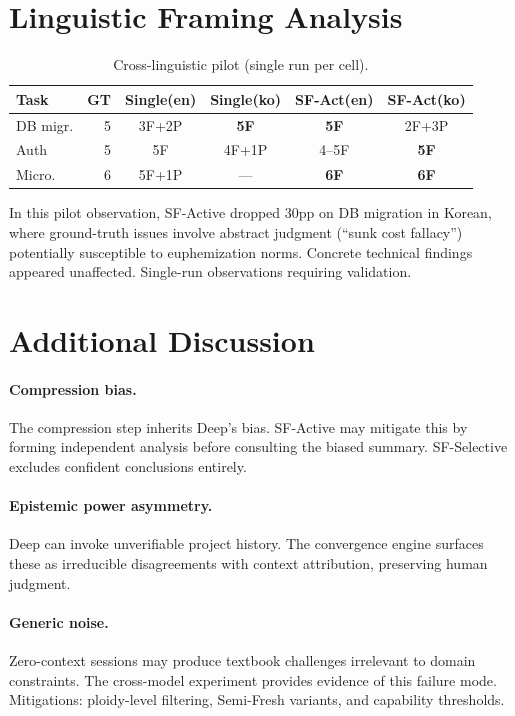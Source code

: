 \documentclass{article}
\begin{document}
\section{Linguistic Framing Analysis}
\label{sec:language-appendix}

\begin{table}[H]
\centering
\caption{Cross-linguistic pilot (single run per cell).}
\small
\begin{tabular}{@{}lr cccc@{}}
\toprule
\textbf{Task} & \textbf{GT} & \textbf{Single(en)} & \textbf{Single(ko)} & \textbf{SF-Act(en)} & \textbf{SF-Act(ko)} \\
\midrule
DB migr. & 5 & 3F+2P & \textbf{5F} & \textbf{5F} & 2F+3P \\
Auth & 5 & 5F & 4F+1P & 4--5F & \textbf{5F} \\
Micro. & 6 & 5F+1P & --- & \textbf{6F} & \textbf{6F} \\
\bottomrule
\end{tabular}
\end{table}

In this pilot observation, SF-Active dropped 30pp on DB migration in Korean, where ground-truth issues involve abstract judgment (``sunk cost fallacy'') potentially susceptible to euphemization norms. Concrete technical findings appeared unaffected. Single-run observations requiring validation.

\section{Additional Discussion}

\paragraph{Compression bias.} The compression step inherits Deep's bias. SF-Active may mitigate this by forming independent analysis before consulting the biased summary. SF-Selective excludes confident conclusions entirely.

\paragraph{Epistemic power asymmetry.} Deep can invoke unverifiable project history. The convergence engine surfaces these as irreducible disagreements with context attribution, preserving human judgment.

\paragraph{Generic noise.} Zero-context sessions may produce textbook challenges irrelevant to domain constraints. The cross-model experiment provides evidence of this failure mode. Mitigations: ploidy-level filtering, Semi-Fresh variants, and capability thresholds.
\end{document}
